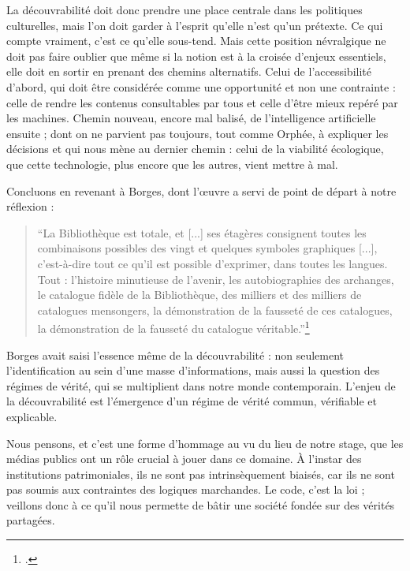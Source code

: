 \documentclass[a4paper,12pt,twoside]{book}
\begin{document}
	La découvrabilité doit donc prendre une place centrale dans les politiques culturelles, mais l’on doit garder à l’esprit qu’elle n’est qu’un prétexte. Ce qui compte vraiment, c’est ce qu’elle sous-tend. Mais cette position névralgique ne doit pas faire oublier que même si la notion est à la croisée d’enjeux essentiels, elle doit en sortir en prenant des chemins alternatifs. Celui de l’accessibilité d’abord, qui doit être considérée comme une opportunité et non une contrainte : celle de rendre les contenus consultables par tous et celle d’être mieux repéré par les machines. Chemin nouveau, encore mal balisé, de l’intelligence artificielle ensuite ; dont on ne parvient pas toujours, tout comme Orphée, à expliquer les décisions et qui nous mène au dernier chemin : celui de la viabilité écologique, que cette technologie, plus encore que les autres, vient mettre à mal.
	
	Concluons en revenant à Borges, dont l'œuvre a servi de point de départ à notre réflexion :
	
	\begin{quote} \enquote{La Bibliothèque est totale, et [...] ses étagères consignent toutes les combinaisons possibles des vingt et quelques symboles graphiques [...], c’est-à-dire tout ce qu’il est possible d’exprimer, dans toutes les langues. Tout : l’histoire minutieuse de l’avenir, les autobiographies des archanges, le catalogue fidèle de la Bibliothèque, des milliers et des milliers de catalogues mensongers, la démonstration de la fausseté de ces catalogues, la démonstration de la fausseté du catalogue véritable.}\footcite[p. 3]{borges1963} \end{quote}
	
	Borges avait saisi l'essence même de la découvrabilité : non seulement l'identification au sein d'une masse d'informations, mais aussi la question des régimes de vérité, qui se multiplient dans notre monde contemporain. L'enjeu de la découvrabilité est l'émergence d'un régime de vérité commun, vérifiable et explicable.
	
	Nous pensons, et c'est une forme d'hommage au vu du lieu de notre stage, que les médias publics ont un rôle crucial à jouer dans ce domaine. À l'instar des institutions patrimoniales, ils ne sont pas intrinsèquement biaisés, car ils ne sont pas soumis aux contraintes des logiques marchandes. Le code, c'est la loi ; veillons donc à ce qu'il nous permette de bâtir une société fondée sur des vérités partagées.
		
	\newpage{\pagestyle{empty}\cleardoublepage}
	
\end{document}
